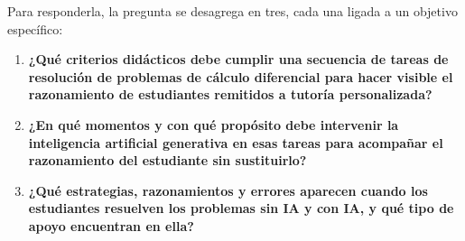 Para responderla, la pregunta se desagrega en tres, cada una ligada a un objetivo específico:

\begin{enumerate}
    \item \textbf{¿Qué criterios didácticos debe cumplir una secuencia de tareas de resolución de problemas de cálculo diferencial para hacer visible el razonamiento de estudiantes remitidos a tutoría personalizada?}

    \item \textbf{¿En qué momentos y con qué propósito debe intervenir la inteligencia artificial generativa en esas tareas para acompañar el razonamiento del estudiante sin sustituirlo?}

    \item \textbf{¿Qué estrategias, razonamientos y errores aparecen cuando los estudiantes resuelven los problemas sin IA y con IA, y qué tipo de apoyo encuentran en ella?}
\end{enumerate}
